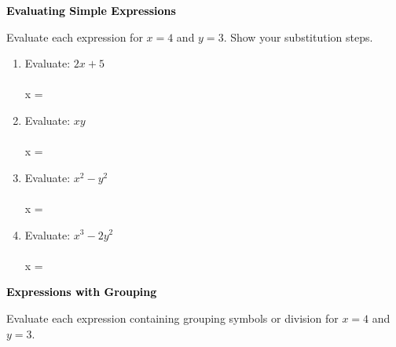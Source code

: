 \documentclass[12pt, letterpaper, fleqn]{article}
\newcommand{\blankshorter}{\underline{\hspace{1.5cm}}}
\begin{document}
\newpage

\begin{tcolorbox}[colback=black!10]
\large\textcolor{black}{\textbf{Evaluating Simple Expressions}}
\end{tcolorbox}

\noindent
Evaluate each expression for $x = 4$ and $y = 3$. Show your substitution steps.

\vspace{3mm}

\begin{enumerate}[itemsep=1.5cm, leftmargin=0.6cm]

\item Evaluate: $2x + 5$ \\ \\
x = \blankshorter

\vspace{1.5cm}

\item Evaluate: $xy$ \\ \\
x = \blankshorter

\vspace{1.5cm}

\item Evaluate: $x^2 - y^2$ \\ \\
x = \blankshorter

\vspace{1.5cm}

\item Evaluate: $x^3 - 2y^2$ \\ \\
x = \blankshorter

\vspace{1.5cm}

\end{enumerate}

\newpage

\begin{tcolorbox}[colback=black!10]
\large\textcolor{black}{\textbf{Expressions with Grouping}}
\end{tcolorbox}

\noindent
Evaluate each expression containing grouping symbols or division for $x = 4$ and $y = 3$.
\end{document}
